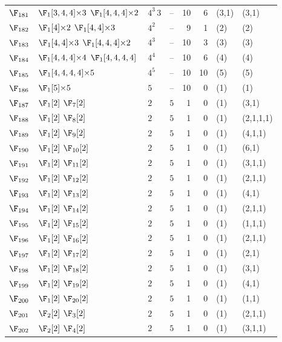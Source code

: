 \begin{landscape}
{\begin{longtable}{@{}l p{8.2cm} l l r r l l@{}}
$\F_{181}$ & $\F_{1}[3,4,4]{\times}3$\; $\F_{1}[4,4,4]{\times}2$ & $4^{3}$\,$3$ & -- & 10 & 6 & (3,1) & (3,1) \\
$\F_{182}$ & $\F_{1}[4]{\times}2$\; $\F_{1}[4,4]{\times}3$ & $4^{2}$ & -- & 9 & 1 & (2) & (2) \\
$\F_{183}$ & $\F_{1}[4,4]{\times}3$\; $\F_{1}[4,4,4]{\times}2$ & $4^{3}$ & -- & 10 & 3 & (3) & (3) \\
$\F_{184}$ & $\F_{1}[4,4,4]{\times}4$\; $\F_{1}[4,4,4,4]$ & $4^{4}$ & -- & 10 & 6 & (4) & (4) \\
$\F_{185}$ & $\F_{1}[4,4,4,4]{\times}5$ & $4^{5}$ & -- & 10 & 10 & (5) & (5) \\
$\F_{186}$ & $\F_{1}[5]{\times}5$ & $5$ & -- & 10 & 0 & (1) & (1) \\
$\F_{187}$ & $\F_{1}[2]$\; $\F_{7}[2]$ & $2$ & $5$ & 1 & 0 & (1) & (3,1) \\
$\F_{188}$ & $\F_{1}[2]$\; $\F_{8}[2]$ & $2$ & $5$ & 1 & 0 & (1) & (2,1,1,1) \\
$\F_{189}$ & $\F_{1}[2]$\; $\F_{9}[2]$ & $2$ & $5$ & 1 & 0 & (1) & (4,1,1) \\
$\F_{190}$ & $\F_{1}[2]$\; $\F_{10}[2]$ & $2$ & $5$ & 1 & 0 & (1) & (6,1) \\
$\F_{191}$ & $\F_{1}[2]$\; $\F_{11}[2]$ & $2$ & $5$ & 1 & 0 & (1) & (3,1,1) \\
$\F_{192}$ & $\F_{1}[2]$\; $\F_{12}[2]$ & $2$ & $5$ & 1 & 0 & (1) & (2,1,1) \\
$\F_{193}$ & $\F_{1}[2]$\; $\F_{13}[2]$ & $2$ & $5$ & 1 & 0 & (1) & (4,1) \\
$\F_{194}$ & $\F_{1}[2]$\; $\F_{14}[2]$ & $2$ & $5$ & 1 & 0 & (1) & (2,1,1) \\
$\F_{195}$ & $\F_{1}[2]$\; $\F_{15}[2]$ & $2$ & $5$ & 1 & 0 & (1) & (1,1,1) \\
$\F_{196}$ & $\F_{1}[2]$\; $\F_{16}[2]$ & $2$ & $5$ & 1 & 0 & (1) & (2,1,1) \\
$\F_{197}$ & $\F_{1}[2]$\; $\F_{17}[2]$ & $2$ & $5$ & 1 & 0 & (1) & (2,1) \\
$\F_{198}$ & $\F_{1}[2]$\; $\F_{18}[2]$ & $2$ & $5$ & 1 & 0 & (1) & (3,1) \\
$\F_{199}$ & $\F_{1}[2]$\; $\F_{19}[2]$ & $2$ & $5$ & 1 & 0 & (1) & (4,1) \\
$\F_{200}$ & $\F_{1}[2]$\; $\F_{20}[2]$ & $2$ & $5$ & 1 & 0 & (1) & (1,1) \\
$\F_{201}$ & $\F_{2}[2]$\; $\F_{3}[2]$ & $2$ & $5$ & 1 & 0 & (1) & (2,1,1) \\
$\F_{202}$ & $\F_{2}[2]$\; $\F_{4}[2]$ & $2$ & $5$ & 1 & 0 & (1) & (3,1,1) \\

\end{longtable}}
\end{landscape}
